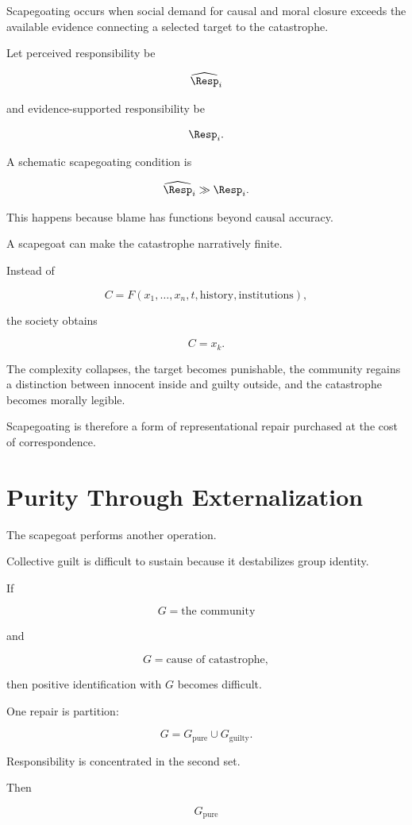 \documentclass[11pt,oneside]{book}
\theoremstyle{definition}
\theoremstyle{remark}
\begin{document}
Scapegoating occurs when social demand for causal and moral closure exceeds the available evidence connecting a selected target to the catastrophe.

Let perceived responsibility be

\[
\widehat{\Resp}_i
\]

and evidence-supported responsibility be

\[
\Resp_i.
\]

A schematic scapegoating condition is

\[
\widehat{\Resp}_i
\gg
\Resp_i.
\]

This happens because blame has functions beyond causal accuracy.

A scapegoat can make the catastrophe narratively finite.

Instead of

\[
C
=
F(
x_1,\ldots,x_n,
t,
\text{history},
\text{institutions}
),
\]

the society obtains

\[
C=x_k.
\]

The complexity collapses, the target becomes punishable, the community regains a distinction between innocent inside and guilty outside, and the catastrophe becomes morally legible.

Scapegoating is therefore a form of representational repair purchased at the cost of correspondence.

\section{Purity Through Externalization}

The scapegoat performs another operation.

Collective guilt is difficult to sustain because it destabilizes group identity.

If

\[
G
=
\text{the community}
\]

and

\[
G
=
\text{cause of catastrophe},
\]

then positive identification with \(G\) becomes difficult.

One repair is partition:

\[
G
=
G_{\mathrm{pure}}
\cup
G_{\mathrm{guilty}}.
\]

Responsibility is concentrated in the second set.

Then

\[
G_{\mathrm{pure}}
\]
\end{document}
